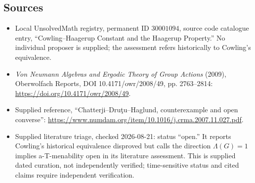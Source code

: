 \documentclass[11pt]{article}
\begin{document}
\subsection{Sources}
\begin{itemize}
\item Local UnsolvedMath registry, permanent ID \(30001094\), source code catalogue entry, ``Cowling--Haagerup Constant and the Haagerup Property.'' No individual proposer is supplied; the assessment refers historically to Cowling's equivalence.
\item \emph{Von Neumann Algebras and Ergodic Theory of Group Actions} (2009), Oberwolfach Reports, DOI 10.4171/owr/2008/49, pp. 2763--2814: \url{https://doi.org/10.4171/owr/2008/49}.
\item Supplied reference, ``Chatterji--Dru\c{t}u--Haglund, counterexample and open converse'': \url{https://www.numdam.org/item/10.1016/j.crma.2007.11.027.pdf}.
\item Supplied literature triage, checked 2026-08-21: status ``open.'' It reports Cowling's historical equivalence disproved but calls the direction \(\Lambda(G)=1\) implies a-T-menability open in its literature assessment. This is supplied dated curation, not independently verified; time-sensitive status and cited claims require independent verification.
\end{itemize}
\end{document}
